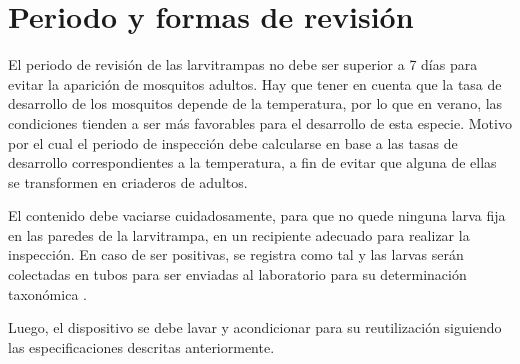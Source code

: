 \section{Periodo y formas de revisión}
El periodo de revisión de las larvitrampas no debe ser superior a 7 días para evitar la aparición
de mosquitos adultos. Hay que tener en cuenta que la tasa de desarrollo de los mosquitos depende
de la temperatura, por lo que en verano, las condiciones tienden a ser más favorables para el
desarrollo de esta especie. Motivo por el cual el periodo de inspección debe calcularse en base a
las tasas de desarrollo correspondientes a la temperatura, a fin de evitar que alguna de ellas se
transformen en criaderos de adultos.

El contenido debe vaciarse cuidadosamente, para que no quede ninguna larva fija en las paredes de
la larvitrampa, en un recipiente adecuado para realizar la inspección. En caso de ser positivas,
se registra como tal y las larvas serán colectadas en tubos para ser enviadas al laboratorio para
su determinación taxonómica \cite{manualControlArg2009}.

Luego, el dispositivo se debe lavar y acondicionar para su reutilización siguiendo las
especificaciones descritas anteriormente.
